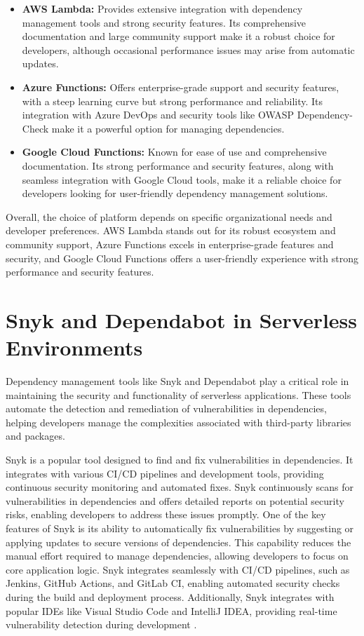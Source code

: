 \documentclass[sigconf]{acmart}
\begin{document}
\begin{itemize}
    \item \textbf{AWS Lambda:} Provides extensive integration with dependency management tools and strong security features. Its comprehensive documentation and large community support make it a robust choice for developers, although occasional performance issues may arise from automatic updates.
    \item \textbf{Azure Functions:} Offers enterprise-grade support and security features, with a steep learning curve but strong performance and reliability. Its integration with Azure DevOps and security tools like OWASP Dependency-Check make it a powerful option for managing dependencies.
    \item \textbf{Google Cloud Functions:} Known for ease of use and comprehensive documentation. Its strong performance and security features, along with seamless integration with Google Cloud tools, make it a reliable choice for developers looking for user-friendly dependency management solutions.
\end{itemize}

Overall, the choice of platform depends on specific organizational needs and developer preferences. AWS Lambda stands out for its robust ecosystem and community support, Azure Functions excels in enterprise-grade features and security, and Google Cloud Functions offers a user-friendly experience with strong performance and security features.


\section{Snyk and Dependabot in Serverless Environments}

Dependency management tools like Snyk and Dependabot play a critical role in maintaining the security and functionality of serverless applications. These tools automate the detection and remediation of vulnerabilities in dependencies, helping developers manage the complexities associated with third-party libraries and packages.

Snyk is a popular tool designed to find and fix vulnerabilities in dependencies. It integrates with various CI/CD pipelines and development tools, providing continuous security monitoring and automated fixes. Snyk continuously scans for vulnerabilities in dependencies and offers detailed reports on potential security risks, enabling developers to address these issues promptly. One of the key features of Snyk is its ability to automatically fix vulnerabilities by suggesting or applying updates to secure versions of dependencies. This capability reduces the manual effort required to manage dependencies, allowing developers to focus on core application logic. Snyk integrates seamlessly with CI/CD pipelines, such as Jenkins, GitHub Actions, and GitLab CI, enabling automated security checks during the build and deployment process. Additionally, Snyk integrates with popular IDEs like Visual Studio Code and IntelliJ IDEA, providing real-time vulnerability detection during development \cite{snyk2023, snykIDE2023}.
\end{document}
